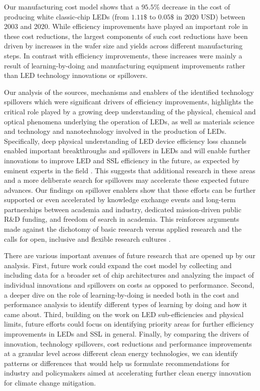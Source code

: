 \documentclass[twoside,twocolumn,9pt]{article}
\begin{document}
Our manufacturing cost model shows that a $95.5\%$ decrease in the cost of producing white classic-chip LEDs (from $1.11\$$ to $0.05\$$ in 2020 USD) between 2003 and 2020. While efficiency improvements have played an important role in these cost reductions, the largest components of such cost reductions have been driven by increases in the wafer size and yields across different manufacturing steps. In contrast with efficiency improvements, these increases were mainly a result of learning-by-doing and manufacturing equipment improvements rather than LED technology innovations or spillovers. 

Our analysis of the sources, mechanisms and enablers of the identified technology spillovers which were significant drivers of efficiency improvements, highlights the critical role played by a growing deep understanding of the physical, chemical and optical phenomena underlying the operation of LEDs, as well as materials science and technology and nanotechnology involved in the production of LEDs. Specifically, deep physical understanding of LED device efficiency loss channels enabled important breakthroughs and spillovers in LEDs and will enable further innovations to improve LED and SSL efficiency in the future, as expected by eminent experts in the field \cite{Weisbuch2020}. This suggests that additional research in these areas and a more deliberate search for spillovers may accelerate these expected future advances. Our findings on spillover enablers show that these efforts can be further supported or even accelerated by knowledge exchange events and long-term partnerships between academia and industry, dedicated mission-driven public R\&D funding, and freedom of search in academia. This reinforces arguments made against the dichotomy of basic research versus applied research \cite{narayanamurti2016cycles} \cite{narayanamurti2021genesis} and the calls for open, inclusive and flexible research cultures \cite{Stephan2021}.

There are various important avenues of future research that are opened up by our analysis. First, future work could expand the cost model by collecting and including data for a broader set of chip architectures and analyzing the impact of individual innovations and spillovers on costs as opposed to performance. Second, a deeper dive on the role of learning-by-doing is needed both in the cost and performance analysis to identify different types of learning by doing and how it came about. Third, building on the work on LED sub-efficiencies and physical limits, future efforts could focus on identifying priority areas for further efficiency improvements in LEDs and SSL in general. Finally, by comparing the drivers of innovation, technology spillovers, cost reductions and performance improvements at a granular level across different clean energy technologies, we can identify patterns or differences that would help us formulate recommendations for industry and policymakers aimed at accelerating further clean energy innovation for climate change mitigation. 
\end{document}
